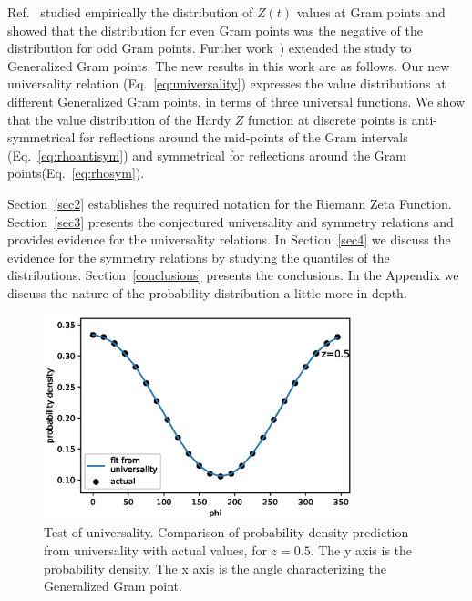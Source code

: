 \documentclass[twoside]{article}
\begin{document}
Ref.~\cite{Shanker 2018a} studied empirically the distribution of $Z(t)$ values at 
Gram points and
showed  that the distribution for even Gram points was the negative  of the 
distribution for odd Gram points. 
Further work~\cite{Shanker 2018b}) extended the study to Generalized Gram points. 
The new results in this work are as follows. 
Our new universality relation (Eq.~\ref{eq:universality}) expresses the value distributions 
at different Generalized Gram points, in terms of three universal functions.
We show that the  value
distribution of the Hardy $Z$ function at discrete points is anti-symmetrical 
for reflections around the mid-points 
of the Gram intervals (Eq.~\ref{eq:rhoantisym}) and symmetrical for reflections 
around the Gram points(Eq.~\ref{eq:rhosym}). 

Section~\ref{sec2} establishes the required notation for the 
Riemann Zeta Function. 
Section~\ref{sec3} presents the conjectured universality and symmetry relations
and provides evidence for the universality relations.
In Section~\ref{sec4} we discuss the evidence for the symmetry relations
by studying the quantiles of the distributions.
Section~\ref{conclusions} presents the conclusions. In the Appendix we discuss
the nature of the probability distribution a little more in depth.


\begin{figure}
\centering
\includegraphics[width=0.8\textwidth]{z05.eps}
\caption[]{ 
 Test of universality. Comparison of probability density prediction from
 universality with actual values, for $z=0.5$. The y axis is the probability density.
 The x axis is the angle characterizing the Generalized Gram point.
  }
\vspace{1mm}
\label{z05}
\end{figure}
\end{document}
